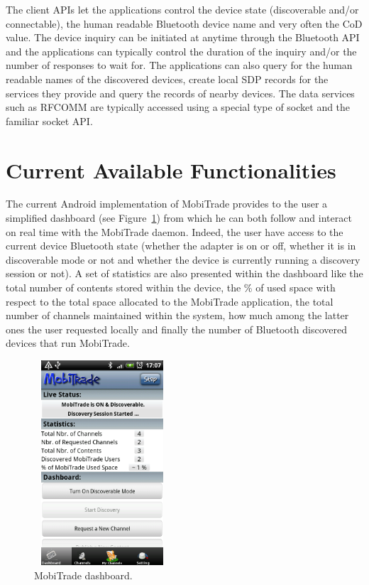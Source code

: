 The client APIs let the applications control the device state (discoverable and/or connectable), the human readable Bluetooth device name and very often the CoD
value. The device inquiry can be initiated at anytime through the Bluetooth API and the applications can typically control the duration of the inquiry and/or the number of
responses to wait for. The applications can also query for the human readable names of the discovered devices, create local SDP records for the services they provide and
query the records of nearby devices. The data services such as RFCOMM are typically accessed using a special type of socket and the familiar socket API.

\section{Current Available Functionalities}
\label{MobiTradeCurrentFunctionalities}

The current Android implementation of MobiTrade provides to the user a simplified dashboard (see Figure~\ref{dashboard}) from which he can both follow and interact on real time with the MobiTrade daemon. Indeed, the user have access to the current device Bluetooth state (whether the adapter is on or off, whether it is in discoverable mode or not and whether the device is currently running a discovery session or not). A set of statistics are also presented within the dashboard like the total number of contents stored within the device, the \% of used space with respect to the total space allocated to the MobiTrade application, the total number of channels maintained within the system, how much among the latter ones the user requested locally and finally the number of Bluetooth discovered devices that run MobiTrade.
 
\begin{figure}[!h]
\begin{center}
\includegraphics[width=2in,height=3in]{Chapitre6/Dashboard.png}
\end{center}
\caption{MobiTrade dashboard.}
\label{dashboard}
\end{figure}

